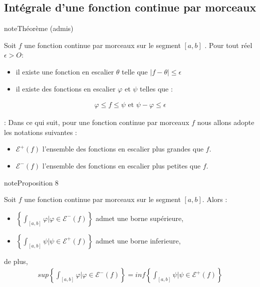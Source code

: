 \documentclass[letterpaper,10pt,french]{sphinxmanual}
\begin{document}
\subsection{Intégrale d’une fonction continue par morceaux}
\label{\detokenize{fcm:integrale-d-une-fonction-continue-par-morceaux}}
\begin{sphinxadmonition}{note}{Théorème (admis)}

\sphinxAtStartPar
Soit \(f\) une fonction continue par morceaux sur le segment \([a, b]\) . Pour tout
réel \(\epsilon > O\):
\begin{itemize}
\item {} 
\sphinxAtStartPar
il existe une fonction en escalier \(\theta\) telle que \(|f - \theta| \leq \epsilon\)

\item {} 
\sphinxAtStartPar
il existe des fonctions en escalier \(\varphi\) et \(\psi\) telles que :

\end{itemize}
\begin{equation*}
\begin{split}
\varphi \leq f \leq \psi \mbox{   et  } \psi - \varphi \leq \epsilon
\end{split}
\end{equation*}\end{sphinxadmonition}

\sphinxAtStartPar
{}: Dans ce qui suit, pour une fonction continue par morceaux \(f\) nous allons adopte les notations suivantes :
\begin{itemize}
\item {} 
\sphinxAtStartPar
\(\mathcal{E}^+(f)\) l’ensemble des fonctions en escalier plus grandes que \(f\).

\item {} 
\sphinxAtStartPar
\(\mathcal{E}^-(f)\) l’ensemble des fonctions en escalier plus petites que \(f\).

\end{itemize}

\begin{sphinxadmonition}{note}{Proposition 8}

\sphinxAtStartPar
Soit \(f\) une fonction continue par morceaux sur le segment \([a, b]\). Alors :
\begin{itemize}
\item {} 
\sphinxAtStartPar
\(\left\{\int_{[a, b]} \varphi | \varphi \in \mathcal{E}^-(f)\right\}\) admet une borne supérieure,

\item {} 
\sphinxAtStartPar
\(\left\{\int_{[a, b]} \psi | \psi \in \mathcal{E}^+(f)\right\}\) admet une borne inferieure,

\end{itemize}

\sphinxAtStartPar
de plus,
\begin{equation*}
\begin{split}
sup\left\{\int_{[a, b]} \varphi | \varphi \in \mathcal{E}^-(f)\right\}= inf\left\{\int_{[a, b]} \psi | \psi \in \mathcal{E}^+(f)\right\}
\end{split}
\end{equation*}\end{sphinxadmonition}
\end{document}
